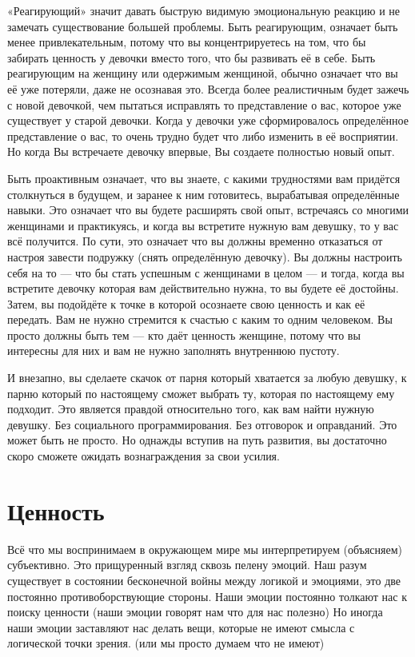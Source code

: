 «Реагирующий» значит давать быструю видимую эмоциональную реакцию и не замечать существование большей проблемы. Быть реагирующим, означает быть менее привлекательным, потому что вы концентрируетесь на том, что бы забирать ценность у девочки вместо того, что бы развивать её в себе. Быть реагирующим на женщину или одержимым женщиной, обычно означает что вы её уже потеряли, даже не осознавая это. Всегда более реалистичным будет зажечь с новой девочкой, чем пытаться исправлять то представление о вас, которое уже существует у старой девочки. Когда у девочки уже сформировалось определённое представление о вас, то очень трудно будет что либо изменить в её восприятии. Но когда Вы встречаете девочку впервые, Вы создаете полностью новый опыт.

Быть проактивным означает, что вы знаете, с какими трудностями вам придётся столкнуться в будущем, и заранее к ним готовитесь, вырабатывая определённые навыки. Это означает что вы будете расширять свой опыт, встречаясь со многими женщинами и практикуясь, и когда вы встретите нужную вам девушку, то у вас всё получится. По сути, это означает что вы должны временно отказаться от настроя завести подружку (снять определённую девочку). Вы должны настроить себя на то --- что бы стать успешным с женщинами в целом --- и тогда, когда вы встретите девочку которая вам действительно нужна, то вы будете её достойны. Затем, вы подойдёте к точке в которой осознаете свою ценность и как её передать. Вам не нужно стремится к счастью с каким то одним человеком. Вы просто должны быть тем --- кто даёт ценность женщине, потому что вы интересны для них и вам не нужно заполнять внутреннюю пустоту.

И внезапно, вы сделаете скачок от парня который хватается за любую девушку, к парню который по настоящему сможет выбрать ту, которая по настоящему ему подходит. Это является правдой относительно того, как вам найти нужную девушку. Без социального программирования. Без отговорок и оправданий. Это может быть не просто. Но однажды вступив на путь развития, вы достаточно скоро сможете ожидать вознаграждения за свои усилия.
\chapter{Ценность}

Всё что мы воспринимаем в окружающем мире мы интерпретируем (объясняем) субъективно. Это прищуренный взгляд сквозь пелену эмоций. Наш разум существует в состоянии бесконечной войны между логикой и эмоциями, это две постоянно противоборствующие стороны. Наши эмоции постоянно толкают нас к поиску ценности (наши эмоции говорят нам что для нас полезно) Но иногда наши эмоции заставляют нас делать вещи, которые не имеют смысла с логической точки зрения. (или мы просто думаем что не имеют)

